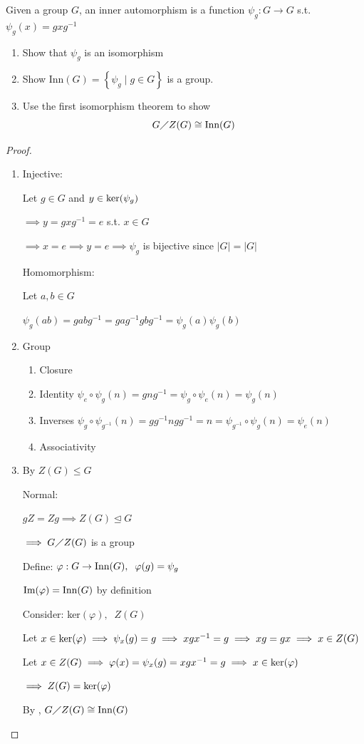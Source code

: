 \begin{example}
    Given a group $G$, an inner automorphism is a function $\psi_g : G \rightarrow G$
    s.t. $\psi_g(x)=gxg^{-1}$

    \begin{enumerate}
        \item Show that $\psi_g$ is an isomorphism
        \item Show Inn$(G)=\left\{ \psi_g \mid g \in G \right\}$ is a group.
        \item Use the first isomorphism theorem to show \[G\diagup Z(G) \cong \text{Inn}(G)\]
    \end{enumerate}
\end{example}

\begin{proof}
    \begin{enumerate}
        \item Injective:

        Let $g \in G$ and $y \in \text{ker}(\psi_g)$

        $\implies y=gxg^{-1}=e$ s.t. $x \in G$

        $\implies x=e \implies y=e \implies \psi_g$ is bijective since $|G|=|G|$

        Homomorphism:

        Let $a,b \in G$

        $\psi_g(ab)=gabg^{-1}=gag^{-1}gbg^{-1}=\psi_g(a)\psi_g(b)$

        \item Group
        \begin{enumerate}
            \item Closure \checkmark
            \item Identity $\psi_e\circ\psi_g(n)=gng^{-1}=\psi_g\circ\psi_e(n)=\psi_g(n)$
            \item Inverses $\psi_g\circ\psi_{g^{-1}}(n)=gg^{-1}ngg^{-1}=n=\psi_{g^{-1}}\circ\psi_g(n)=\psi_e(n)$
            \item Associativity \checkmark
        \end{enumerate}
    \item By  $Z(G)\leq G$
    
    Normal:

    $gZ=Zg \implies Z(G) \unlhd G$

    $\implies G\diagup Z(G)$ is a group

    Define: $\varphi: G \rightarrow \text{Inn}(G),\;\;\varphi(g)=\psi_g$

    $\text{Im}(\varphi)=\text{Inn}(G)$ by definition

    Consider: ker$(\varphi),\;\;Z(G)$

    Let $x \in \text{ker}(\varphi) \implies \psi_x(g)=g \implies xgx^{-1}=g \implies xg=gx \implies x \in Z(G)$

    Let $x \in Z(G) \implies \varphi(x)=\psi_x(g)=xgx^{-1}=g \implies x \in \text{ker}(\varphi)$

    $\implies Z(G)=\text{ker}(\varphi)$

    By , $G\diagup Z(G)\cong \text{Inn}(G)$
    \end{enumerate}
\end{proof}